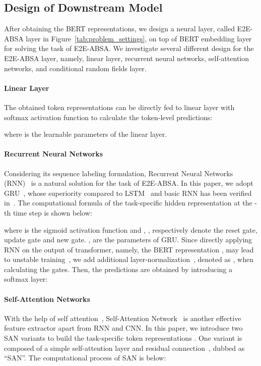 \documentclass[11pt,a4paper]{article}
\begin{document}
\subsection{Design of Downstream Model}
After obtaining the BERT representations, we design a neural layer, called E2E-ABSA layer in Figure~\ref{tab:problem_settings}, on top of BERT embedding layer for solving the task of E2E-ABSA. We investigate several different design for the E2E-ABSA layer, namely, linear layer, recurrent neural networks, self-attention networks, and conditional random fields layer. 
\paragraph{Linear Layer} The obtained token representations can be directly fed to linear layer with softmax activation function to calculate the token-level predictions:

where  is the learnable parameters of the linear layer. 
\paragraph{Recurrent Neural Networks} Considering its sequence labeling formulation, Recurrent Neural Networks (RNN)~\cite{elman1990finding} is a natural solution for the task of E2E-ABSA. In this paper, we adopt GRU~\cite{cho-etal-2014-learning}, whose superiority compared to LSTM~\cite{hochreiter1997long} and basic RNN has been verified in~\citet{jozefowicz2015empirical}. The computational formula of the task-specific hidden representation  at the -th time step is shown below:

where  is the sigmoid activation function and , ,  respectively denote the reset gate, update gate and new gate. ,  are the parameters of GRU. Since directly applying RNN on the output of transformer, namely, the BERT representation , may lead to unstable training~\cite{chen-etal-2018-best,liu2019fine}, we add additional layer-normalization~\cite{ba2016layer}, denoted as , when calculating the gates. Then, the predictions are obtained by introducing a softmax layer:


\paragraph{Self-Attention Networks} With the help of self attention~\cite{cheng-etal-2016-long,lin2017structured}, Self-Attention Network~\cite{vaswani2017attention,shen2018disan} is another effective feature extractor apart from RNN and CNN. In this paper, we introduce two SAN variants to build the task-specific token representations . One variant is composed of a simple self-attention layer and residual connection~\cite{he2016deep}, dubbed as ``SAN''. The computational process of SAN is below:
\end{document}
